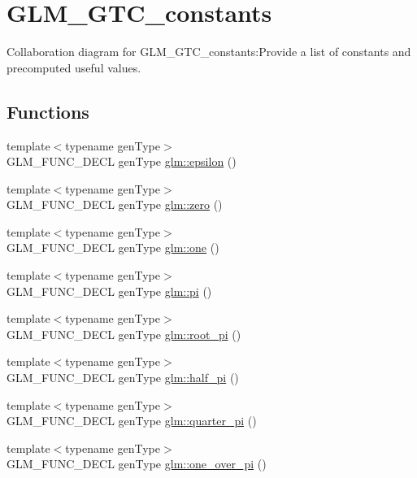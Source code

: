 \hypertarget{group__gtc__constants}{
\section{GLM\_\-GTC\_\-constants}
\label{group__gtc__constants}
}


Collaboration diagram for GLM\_\-GTC\_\-constants:Provide a list of constants and precomputed useful values.  
\subsection*{Functions}
\begin{CompactItemize}
\item 
{\footnotesize template$<$typename genType$>$ }\\GLM\_\-FUNC\_\-DECL genType \hyperlink{group__gtc__constants_g136c74927d8ab624f3c008bcd8c4445b}{glm::epsilon} ()
\item 
{\footnotesize template$<$typename genType$>$ }\\GLM\_\-FUNC\_\-DECL genType \hyperlink{group__gtc__constants_g888d199297a924864bc2235f5133c30f}{glm::zero} ()
\item 
{\footnotesize template$<$typename genType$>$ }\\GLM\_\-FUNC\_\-DECL genType \hyperlink{group__gtc__constants_gbc71dfc97639e8010a39c1892e68ed9b}{glm::one} ()
\item 
{\footnotesize template$<$typename genType$>$ }\\GLM\_\-FUNC\_\-DECL genType \hyperlink{group__gtc__constants_g7e73289d56099ea4789c597750dc68b8}{glm::pi} ()
\item 
{\footnotesize template$<$typename genType$>$ }\\GLM\_\-FUNC\_\-DECL genType \hyperlink{group__gtc__constants_g94ccd058b697006c9aacc2329edc05a0}{glm::root\_\-pi} ()
\item 
{\footnotesize template$<$typename genType$>$ }\\GLM\_\-FUNC\_\-DECL genType \hyperlink{group__gtc__constants_gac1d3ec09335dd506ecc76a0097db220}{glm::half\_\-pi} ()
\item 
{\footnotesize template$<$typename genType$>$ }\\GLM\_\-FUNC\_\-DECL genType \hyperlink{group__gtc__constants_g42880986550674518989d057ee8b6407}{glm::quarter\_\-pi} ()
\item 
{\footnotesize template$<$typename genType$>$ }\\GLM\_\-FUNC\_\-DECL genType \hyperlink{group__gtc__constants_gcbd54875746accf5c4c5a52582c8d764}{glm::one\_\-over\_\-pi} ()

\end{CompactItemize}
